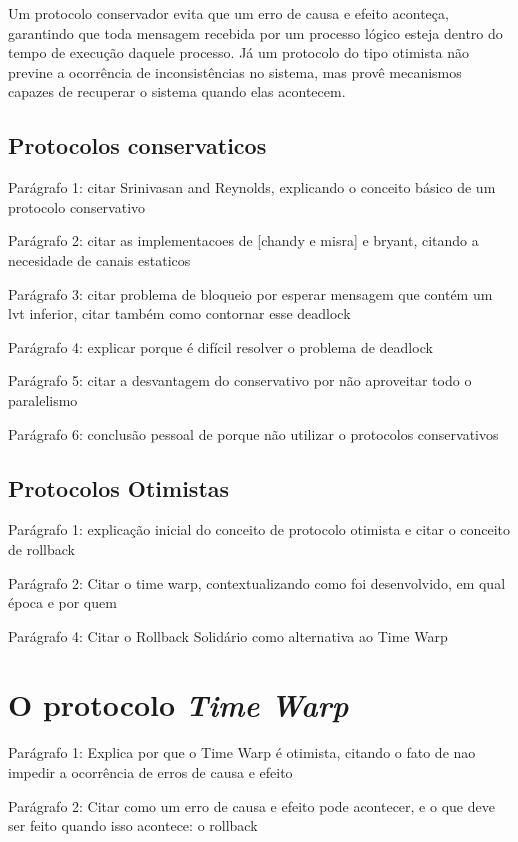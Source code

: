 Um protocolo conservador evita que um erro de causa e efeito aconteça, garantindo que toda mensagem recebida por um processo lógico esteja dentro do tempo de execução daquele processo. Já um protocolo do tipo otimista não previne a ocorrência de inconsistências no sistema, mas provê mecanismos capazes de recuperar o sistema quando elas acontecem.

\subsection{Protocolos conservaticos}

Parágrafo 1: citar Srinivasan and Reynolds, explicando o conceito básico de um protocolo conservativo

Parágrafo 2: citar as implementacoes de [chandy e misra] e bryant, citando a necesidade de canais estaticos

Parágrafo 3: citar problema de bloqueio por esperar mensagem que contém um lvt inferior, citar também como contornar esse deadlock

Parágrafo 4: explicar porque é difícil resolver o problema de deadlock

Parágrafo 5: citar a desvantagem do conservativo por não aproveitar todo o paralelismo

Parágrafo 6: conclusão pessoal de porque não utilizar o protocolos conservativos

\subsection{Protocolos Otimistas}

Parágrafo 1: explicação inicial do conceito de protocolo otimista e citar o conceito de rollback

Parágrafo 2: Citar o time warp, contextualizando como foi desenvolvido, em qual época e por quem

Parágrafo 4: Citar o Rollback Solidário como alternativa ao Time Warp

\section{O protocolo \textit{Time Warp}}

Parágrafo 1: Explica por que o Time Warp é otimista, citando o fato de nao impedir a ocorrência de erros de causa e efeito

Parágrafo 2: Citar como um erro de causa e efeito pode acontecer, e o que deve ser feito quando isso acontece: o rollback

